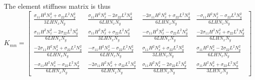 The element stiffness matrix is thus
\begin{equation}
  K_{mn}=\begin{bmatrix}
  \frac{\sigma_{11}H^{2}N_{x}^{2}+\sigma_{22}L^{2}N_{y}^{2}}{3 L H N_{x} N_{y}} &
  \frac{\sigma_{11}H^{2}N_{x}^{2}-2 \sigma_{22}L^{2}N_{y}^{2}}{6 L H N_{x} N_{y}} &
  \frac{-2 \sigma_{11}H^{2}N_{x}^{2}+\sigma_{22}L^{2}N_{y}^{2}}{6 L H N_{x} N_{y}} &
  \frac{-\sigma_{11}H^{2}N_{x}^{2}-\sigma_{22}L^{2}N_{y}^{2}}{6 L H N_{x} N_{y}} \\
  \frac{\sigma_{11}H^{2}N_{x}^{2}-2 \sigma_{22}L^{2}N_{y}^{2}}{6 L H N_{x} N_{y}} &
  \frac{\sigma_{11}H^{2}N_{x}^{2}+\sigma_{22}L^{2}N_{y}^{2}}{3 L H N_{x} N_{y}} &
  \frac{-\sigma_{11}H^{2}N_{x}^{2}-\sigma_{22}L^{2}N_{y}^{2}}{6 L H N_{x} N_{y}} &
  \frac{-2 \sigma_{11}H^{2}N_{x}^{2}+\sigma_{22}L^{2}N_{y}^{2}}{6 L H N_{x} N_{y}} \\
  \frac{-2 \sigma_{11}H^{2}N_{x}^{2}+\sigma_{22}L^{2}N_{y}^{2}}{6 L H N_{x} N_{y}} &
  \frac{-\sigma_{11}H^{2}N_{x}^{2}-\sigma_{22}L^{2}N_{y}^{2}}{6 L H N_{x} N_{y}} &
  \frac{\sigma_{11}H^{2}N_{x}^{2}+\sigma_{22}L^{2}N_{y}^{2}}{3 L H N_{x} N_{y}} &
  \frac{\sigma_{11}H^{2}N_{x}^{2}-2 \sigma_{22}L^{2}N_{y}^{2}}{6 L H N_{x} N_{y}} \\
  \frac{-\sigma_{11}H^{2}N_{x}^{2}-\sigma_{22}L^{2}N_{y}^{2}}{6 L H N_{x} N_{y}} &
  \frac{-2 \sigma_{11}H^{2}N_{x}^{2}+\sigma_{22}L^{2}N_{y}^{2}}{6 L H N_{x} N_{y}} &
  \frac{\sigma_{11}H^{2}N_{x}^{2}-2 \sigma_{22}L^{2}N_{y}^{2}}{6 L H N_{x} N_{y}} &
  \frac{\sigma_{11}H^{2}N_{x}^{2}+\sigma_{22}L^{2}N_{y}^{2}}{3 L H N_{x} N_{y}}
  \end{bmatrix}
  \label{eqn:FEMTwoDGenLaplaceElementStiffnessMatrix}
\end{equation}

